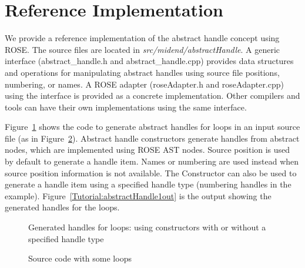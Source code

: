 \section{Reference Implementation}
We provide a reference implementation of the abstract handle concept using ROSE. 
The source files are located in \textit{src/midend/abstractHandle}.
A generic interface (abstract\_handle.h and abstract\_handle.cpp) provides
data structures and operations for manipulating abstract handles using source file positions, numbering, or names. 
A ROSE adapter (roseAdapter.h and roseAdapter.cpp) using the interface is provided as a concrete implementation. 
Other compilers and tools can have their own implementations using the same interface.  

Figure~\ref{Tutorial:abstractHandle1} shows the code to generate abstract
handles for loops in an input source file (as in
Figure~\ref{Tutorial:abstractHandle1input}). 
Abstract handle constructors generate handles from abstract nodes, which are implemented using ROSE AST nodes. 
Source position is used by default to generate a handle item. 
Names or numbering are used instead when source position information is not available. 
The Constructor can also be used to generate a handle item using a
specified handle type (numbering handles in the example).
Figure~\ref{Tutorial:abstractHandle1out} is the output showing the generated handles for the loops.
\begin{figure}[!h]
{\indent
{\mySmallestFontSize
\begin{latexonly}
  
\end{latexonly}

\begin{htmlonly}
   
\end{htmlonly}

}
}
\caption{Generated handles for loops: using constructors with or without a specified handle type}
\label{Tutorial:abstractHandle1}
\end{figure}
\begin{figure}[!h]
{\indent
{\mySmallestFontSize
\begin{latexonly}
  
\end{latexonly}

\begin{htmlonly}
   
\end{htmlonly}

}
}
\caption{Source code with some loops}
\label{Tutorial:abstractHandle1input}
\end{figure}


